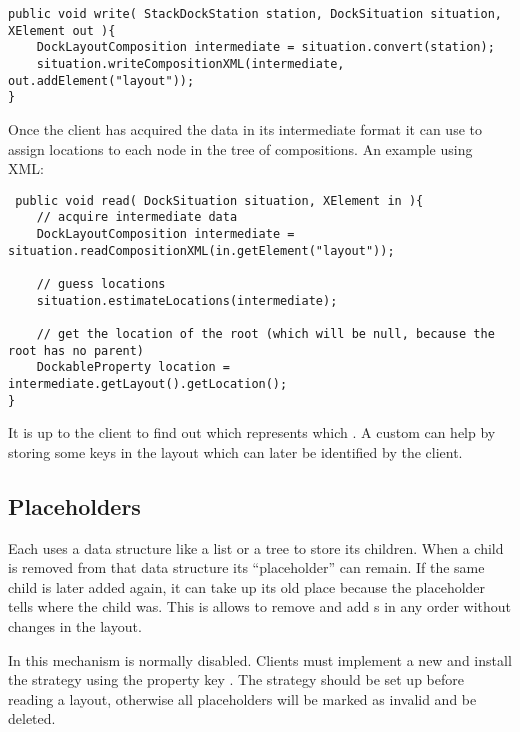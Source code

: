 \begin{lstlisting}
public void write( StackDockStation station, DockSituation situation, XElement out ){
	DockLayoutComposition intermediate = situation.convert(station);
	situation.writeCompositionXML(intermediate, out.addElement("layout"));
}
\end{lstlisting}

Once the client has acquired the data in its intermediate format it can use  to assign locations to each node in the tree of compositions. An example using XML:

\begin{lstlisting}
 public void read( DockSituation situation, XElement in ){
	// acquire intermediate data
	DockLayoutComposition intermediate = situation.readCompositionXML(in.getElement("layout"));

	// guess locations
	situation.estimateLocations(intermediate);

	// get the location of the root (which will be null, because the root has no parent)
	DockableProperty location = intermediate.getLayout().getLocation();
}
\end{lstlisting}

It is up to the client to find out which  represents which . A custom  can help by storing some keys in the layout which can later be identified by the client.



\subsection{Placeholders}
Each  uses a data structure like a list or a tree to store its children. When a child is removed from that data structure its ``placeholder'' can remain. If the same child is later added again, it can take up its old place because the placeholder tells where the child was. This is allows to remove and add s in any order without changes in the layout.

In  this mechanism is normally disabled. Clients must implement a new  and install the strategy using the property key . The strategy should be set up before reading a layout, otherwise all placeholders will be marked as invalid and be deleted.

